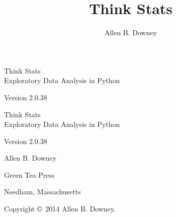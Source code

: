 \documentclass[12pt]{book}
\title{Think Stats}
\author{Allen B. Downey}
\newcommand{\thetitle}{Think Stats}
\newcommand{\thesubtitle}{Exploratory Data Analysis in Python}
\newcommand{\theversion}{2.0.38}
\theoremstyle{exercise}
\newcommand{\blankpage}{\thispagestyle{empty} \quad \newpage}
\begin{document}
\frontmatter

\begin{titlepage}
\thispagestyle{empty}

\begin{flushright}
\vspace*{2.0in}

\begin{spacing}{3}
{\huge \thetitle}\\
{\Large \thesubtitle }
\end{spacing}

\vspace{0.25in}

Version \theversion

\vfill

\end{flushright}


\blankpage
\blankpage

\pagebreak
\thispagestyle{empty}

\begin{flushright}
\vspace*{2.0in}

\begin{spacing}{3}
{\huge \thetitle}\\
{\Large \thesubtitle}
\end{spacing}

\vspace{0.25in}

Version \theversion

\vspace{1in}


{\Large
Allen B. Downey\\
}


\vspace{0.5in}

{\Large Green Tea Press}

{\small Needham, Massachusetts}

\vfill

\end{flushright}


\pagebreak
\thispagestyle{empty}

{\small
Copyright \copyright ~2014 Allen B. Downey.


}
\end{titlepage}
\end{document}
